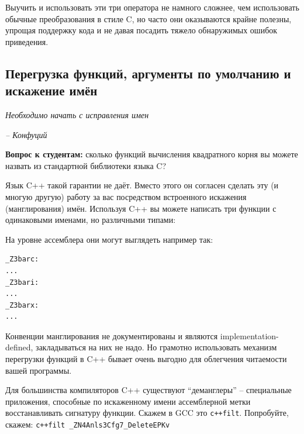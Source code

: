 \documentclass[a4paper,12pt,oneside]{article}
\newif\ifanswers
\begin{document}
Выучить и использовать эти три оператора не намного сложнее, чем использовать обычные преобразования в стиле C, но часто они оказываются крайне полезны, упрощая поддержку кода и не давая посадить тяжело обнаружимых ошибок приведения.

\pagebreak
\subsection{Перегрузка функций, аргументы по умолчанию и искажение имён}\label{NameResolution}

\hfill\textit{Необходимо начать с исправления имен}{\vspace{0.5em}}

\hfill\textit{-- Конфуций}

\textbf{Вопрос к студентам:} сколько функций вычисления квадратного корня вы можете назвать из стандартной библиотеки языка C?

\ifanswers
Правильный ответ: три (7.12.7.5) \lstinline!sqrtf!, \lstinline!sqrt! и \lstinline!sqrtl!. Три функции с разными именами понадобилось вводить потому, что они принимают аргументы разных типов, а язык C предоставляет достаточно сильную гарантию того, что любое имя, использованное в вашей программе будет отображено в ассемблер вашей целевой машины один к одному, без искажения.
\fi

Язык C++ такой гарантии не даёт. Вместо этого он согласен сделать эту (и многую другую) работу за вас посредством встроенного искажения (манглирования) имён. Используя C++ вы можете написать три функции с одинаковыми именами, но различными типами:



На уровне ассемблера они могут выглядеть например так:

\begin{verbatim}
_Z3barc:
...
_Z3bari:
...
_Z3barx:
...
\end{verbatim}

Конвенции манглирования не документированы и являются implementation-defined, закладываться на них не надо. Но грамотно использовать механизм перегрузки функций в C++ бывает очень выгодно для облегчения читаемости вашей программы.

Для большинства компиляторов C++ существуют ``деманглеры'' -- специальные приложения, способные по искаженному имени ассемблерной метки восстанавливать сигнатуру функции. Скажем в GCC это \lstinline!c++filt!. Попробуйте, скажем: \lstinline!c++filt _ZN4Anls3Cfg7_DeleteEPKv!
\end{document}

